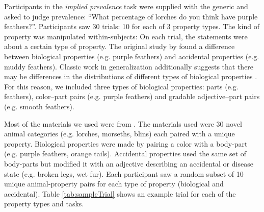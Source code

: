 \documentclass[10pt,letterpaper]{article}
\begin{document}
Participants in the \emph{implied prevalence} task were supplied with the generic and asked to judge prevalence: ``What percentage of lorches do you think have purple feathers?''. Participants saw 30 trials: 10 for each of 3 property types.
The kind of property was manipulated within-subjects: On each trial, the statements were about a certain type of property. 
The original study by \citeauthor{Cimpian2010} found a difference between biological properties (e.g. purple feathers) and accidental properties (e.g. muddy feathers). 
Classic work in generalization additionally suggests that there may be differences in the distributions of different types of biological properties \cite{Nisbett1983} . 
For this reason, we included three types of biological properties: parts (e.g. feathers), color--part pairs (e.g. purple feathers) and gradable adjective--part pairs (e.g. smooth feathers). 




%
 
Most of the materials we used were from \citeauthor{Cimpian2010}. The materials used were 30 novel animal categories (e.g. lorches, morseths, blins) each paired with a unique property. 
Biological properties were made by pairing a color with a body-part (e.g. purple feathers, orange tails). 
Accidental properties used the same set of body-parts but modified it with an adjective describing an accidental or disease state (e.g. broken legs, wet fur). 
Each participant saw a random subset of 10 unique animal-property pairs for each type of property (biological and accidental). 
Table \ref{tab:sampleTrial} shows an example trial for each of the property types and tasks.
\end{document}

